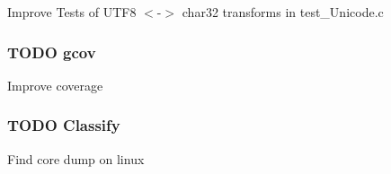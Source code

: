 \begin{DoxyItemize}
\item Improve Tests of U\+T\+F8 $<$-\/$>$ char32 transforms in test\+\_\+\+Unicode.\+c
\end{DoxyItemize}

\subsubsection*{T\+O\+DO gcov}


\begin{DoxyItemize}
\item Improve coverage
\end{DoxyItemize}

\subsubsection*{T\+O\+DO Classify}


\begin{DoxyItemize}
\item Find core dump on linux 
\end{DoxyItemize}